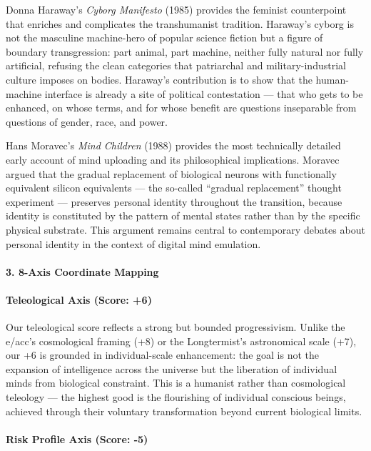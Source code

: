 Donna Haraway's \emph{Cyborg Manifesto} (1985) provides the feminist
counterpoint that enriches and complicates the transhumanist tradition.
Haraway's cyborg is not the masculine machine-hero of popular science
fiction but a figure of boundary transgression: part animal, part
machine, neither fully natural nor fully artificial, refusing the clean
categories that patriarchal and military-industrial culture imposes on
bodies. Haraway's contribution is to show that the human-machine
interface is already a site of political contestation --- that who gets
to be enhanced, on whose terms, and for whose benefit are questions
inseparable from questions of gender, race, and power.

Hans Moravec's \emph{Mind Children} (1988) provides the most technically
detailed early account of mind uploading and its philosophical
implications. Moravec argued that the gradual replacement of biological
neurons with functionally equivalent silicon equivalents --- the
so-called ``gradual replacement'' thought experiment --- preserves
personal identity throughout the transition, because identity is
constituted by the pattern of mental states rather than by the specific
physical substrate. This argument remains central to contemporary
debates about personal identity in the context of digital mind
emulation.

\paragraph{3. 8-Axis Coordinate
Mapping}\label{axis-coordinate-mapping-16}

\paragraph{Teleological Axis (Score:
+6)}\label{teleological-axis-score-6}

Our teleological score reflects a strong but bounded progressivism.
Unlike the e/acc's cosmological framing (+8) or the Longtermist's
astronomical scale (+7), our +6 is grounded in individual-scale
enhancement: the goal is not the expansion of intelligence across the
universe but the liberation of individual minds from biological
constraint. This is a humanist rather than cosmological teleology ---
the highest good is the flourishing of individual conscious beings,
achieved through their voluntary transformation beyond current
biological limits.

\paragraph{Risk Profile Axis (Score:
-5)}\label{risk-profile-axis-score--5}

